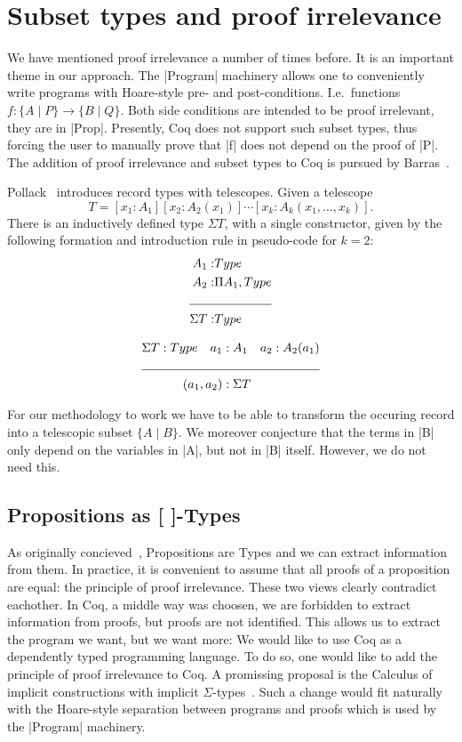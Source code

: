 \documentclass[a4paper,10pt, runningheads]{llncs}
\begin{document}
\section{Subset types and proof irrelevance}\label{PI}
We have mentioned proof irrelevance a number of times before. It is an important theme in our
approach. The |Program| machinery allows one to conveniently write programs with Hoare-style
pre- and post-conditions. I.e.\ functions $f: \{ A \mid P \} \to \{ B \mid Q \}$. Both side
conditions
are intended to be proof irrelevant, they are in |Prop|. Presently, Coq does not support such subset
types, thus forcing the user to manually prove that |f| does not depend on the proof of |P|.
The addition of proof irrelevance and subset types to Coq is pursued by
Barras~\cite{Barras:subset,Werner}. 

Pollack~\cite{pollack2000dependently} introduces record types with telescopes. 
Given a telescope\[
T=[x_1:A_1][x_2:A_2(x_1)]\cdots[x_k:A_k(x_1,\ldots,x_k)].
\]
There is an inductively defined type $\Sigma T$, with a single constructor, given by the following 
formation and introduction rule in pseudo-code for $k=2$:
\begin{align*}
 A_1 :& Type\\
 A_2 :& \Pi A_1,Type\\
\cline{1-2}
\Sigma T :& Type
\end{align*}

\begin{align*}
 \Sigma T:Type\quad a_1 &:A_1 \quad a_2 : A_2(a_1)\\
\cline{1-3}
(a_1,a_2) &:\Sigma T
\end{align*}

For our methodology to work we have to be able to transform the occuring record into a telescopic
subset $\{ A \mid  B\}$. We moreover conjecture that the terms in |B| only depend on the
variables in |A|, but not in |B| itself. However, we do not need this.

\subsection{Propositions as [ ]-Types}
As originally concieved~\cite{ITT,CMCP}, Propositions are Types and we can extract information from
them. In practice, it is convenient to assume that all proofs of a proposition are equal: the
principle of proof irrelevance. These two views clearly contradict eachother. In Coq, a middle way
was choosen, we are forbidden to extract information from proofs, but proofs are not identified.
This allows us to extract the program we want, but we want more:
We would like to use Coq as a dependently typed programming language. To do so,
one would like to add the principle of proof irrelevance to Coq. A promissing proposal is the
Calculus of implicit constructions with implicit
$\Sigma$-types~\cite{miquel2001implicit,barras2008implicit,barrasSigma}. Such a change would fit
naturally with the Hoare-style separation between programs and proofs which is used by the |Program|
machinery. 
\end{document}
